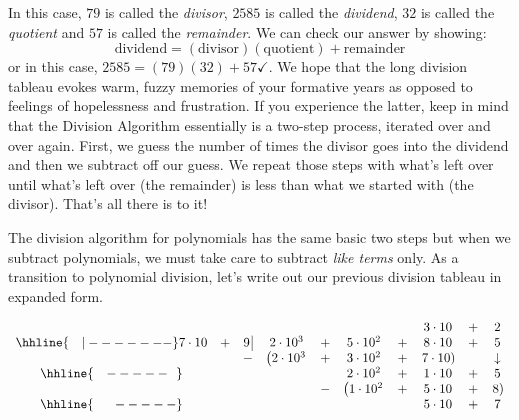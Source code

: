 \setlength\arraycolsep{5pt}
\setlength\extrarowheight{0pt}

In this case, $79$ is called the \emph{divisor}, $2585$ is called the \emph{dividend}, $32$ is called the \emph{quotient} and $57$ is called the \emph{remainder}.  We can check our answer by showing:  \[ \text{dividend} = (\text{divisor})( \text{quotient}) + \text{remainder}\] or in this case, $2585 = 
 (79)(32) + 57 \checkmark$.  We hope that the long division tableau evokes warm, fuzzy memories of your formative years as opposed to feelings of hopelessness and frustration.  If you experience the latter, keep in mind that the Division Algorithm essentially is a two-step process, iterated over and over again.  First, we guess the number of times the divisor goes into the dividend and  then we subtract off our guess.  We repeat those steps with what's left over until what's left over (the remainder) is less than what we started with (the divisor).  That's all there is to it!

\smallskip

The division algorithm for polynomials has the same basic two steps but when we subtract polynomials, we must take care to subtract \emph{like terms} only.  As a transition to polynomial division, let's write out our previous division tableau in expanded form.


\setlength\arraycolsep{0.1pt}
\setlength\extrarowheight{2pt}

\[ \begin{array}{cccccccccc}

& & & & & & & 3 \cdot 10 & + & 2 \\ \hhline{~~~|-------}

7 \cdot 10 & + & 9 \, \vline& 2\cdot 10^3 & + & 5 \cdot 10^2 & + & 8 \cdot 10 & + & 5 \\

 &  &  -& \left(2 \cdot 10^3 \right. & + &  3 \cdot 10^2  & + & \left. 7 \cdot 10 \right) &  &  \downarrow \\ \hhline{~~~-----~~} 
 &  &  &   &  & 2 \cdot 10^2 & +  & 1 \cdot 10 & + & 5 \\ 
 &  &  &   & - & \left(1 \cdot 10^2 \right. & +  &  5 \cdot 10 &  + &\left.  8 \right) \\ \hhline{~~~~~-----} 
 &  &  &   &   &  & & 5 \cdot 10  & + & 7 \\

 
\end{array}\]


